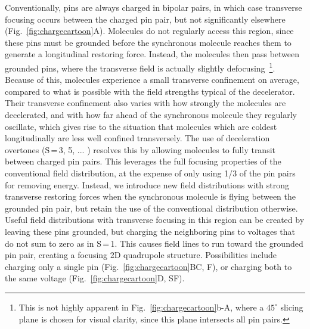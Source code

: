 \documentclass[%
 reprint,
 amsmath,amssymb,
 aps,
prl,
]{revtex4-1}
\begin{document}
Conventionally, pins are always charged in bipolar pairs, in which case transverse focusing occurs between the charged pin pair, but not significantly elsewhere (Fig.~\ref{fig:chargecartoon}A).
Molecules do not regularly access this region, since these pins must be grounded before the synchronous molecule reaches them to generate a longitudinal restoring force.
Instead, the molecules then pass between grounded pins, where the transverse field is actually slightly defocusing~\footnote{This is not highly apparent in Fig.~\ref{fig:chargecartoon}b-A, where a $45^\circ$ slicing plane is chosen for visual clarity, since this plane intersects all pin pairs.}.
Because of this, molecules experience a small transverse confinement on average, compared to what is possible with the field strengths typical of the decelerator. 
Their transverse confinement also varies with how strongly the molecules are decelerated, and with how far ahead of the synchronous molecule they regularly oscillate, which gives rise to the situation that molecules which are coldest longitudinally are less well confined transversely.
The use of deceleration overtones (S\,=\,3, 5, ... ) \cite{VanDeMeerakker2005a} resolves this by allowing molecules to fully transit between charged pin pairs. 
This leverages the full focusing properties of the conventional field distribution, at the expense of only using 1/3 of the pin pairs for removing energy. 
Instead, we introduce new field distributions with strong transverse restoring forces when the synchronous molecule is flying between the grounded pin pair, but retain the use of the conventional distribution otherwise.
Useful field distributions with transverse focusing in this region can be created by leaving these pins grounded, but charging the neighboring pins to voltages that do not sum to zero as in S\,=\,1.
This causes field lines to run toward the grounded pin pair, creating a focusing 2D quadrupole structure.
Possibilities include charging only a single pin (Fig.~\ref{fig:chargecartoon}BC, F), or charging both to the same voltage (Fig.~\ref{fig:chargecartoon}D, SF).
\end{document}

